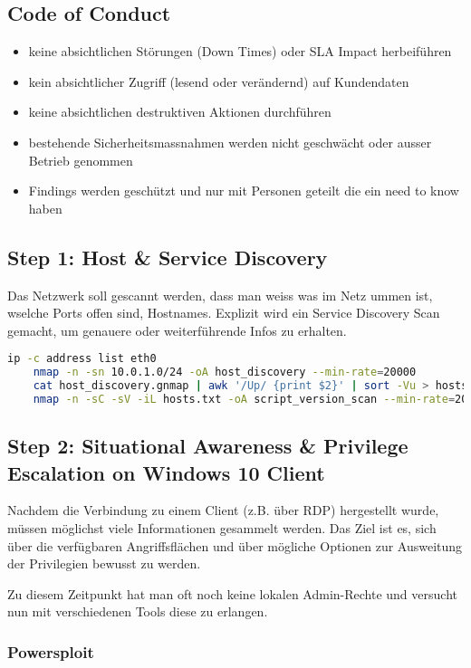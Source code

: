\subsection{Code of Conduct}
\begin{itemize}
    \item keine absichtlichen Störungen (Down Times) oder SLA Impact herbeiführen
    \item kein absichtlicher Zugriff (lesend oder verändernd) auf Kundendaten
    \item keine absichtlichen destruktiven Aktionen durchführen
    \item bestehende Sicherheitsmassnahmen werden nicht geschwächt oder ausser Betrieb genommen
    \item Findings werden geschützt und nur mit Personen geteilt die ein need to know haben
\end{itemize}

\newpage

\subsection{Step 1: Host \& Service Discovery}
Das Netzwerk soll gescannt werden, dass man weiss was im Netz ummen ist, wselche Ports offen sind, Hostnames.
Explizit wird ein Service Discovery Scan gemacht, um genauere oder weiterführende Infos zu erhalten. 

\begin{lstlisting}[language=bash]
    ip -c address list eth0
    nmap -n -sn 10.0.1.0/24 -oA host_discovery --min-rate=20000
    cat host_discovery.gnmap | awk '/Up/ {print $2}' | sort -Vu > hosts.txt
    nmap -n -sC -sV -iL hosts.txt -oA script_version_scan --min-rate=20000
\end{lstlisting}

\subsection{Step 2: Situational Awareness \& Privilege Escalation on Windows 10 Client}
Nachdem die Verbindung zu einem Client (z.B. über RDP) hergestellt wurde, müssen möglichst viele Informationen gesammelt werden. Das Ziel ist es, sich über die verfügbaren Angriffsflächen und über mögliche Optionen zur Ausweitung der Privilegien bewusst zu werden.

Zu diesem Zeitpunkt hat man oft noch keine lokalen Admin-Rechte und versucht nun mit verschiedenen Tools diese zu erlangen.

\subsubsection{Powersploit}

